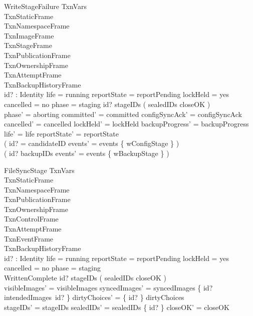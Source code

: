 \documentclass{article}
\begin{document}
\begin{schema}{WriteStageFailure}
	\Delta TxnVars \\
	TxnStaticFrame \\
	TxnNamespaceFrame \\
	TxnImageFrame \\
	TxnStageFrame \\
	TxnPublicationFrame \\
	TxnOwnershipFrame \\
	TxnAttemptFrame \\
	TxnBackupHistoryFrame \\
	id? : Identity
	\where
	life = running \land reportState = reportPending \land lockHeld = yes \land
	cancelled = no \land phase = staging \land
	id? \in stageIDs \setminus ( sealedIDs \cup closeOK ) \\
	phase' = aborting \land committed' = committed \land
	configSyncAck' = configSyncAck \land cancelled' = cancelled \land
	lockHeld' = lockHeld \land backupProgress' = backupProgress \land
	life' = life \land reportState' = reportState \\
	( id? = candidateID \implies events' = events \cup \{ wConfigStage \} ) \\
	( id? \in backupIDs \implies events' = events \cup \{ wBackupStage \} )
\end{schema}

\begin{schema}{FileSyncStage}
	\Delta TxnVars \\
	TxnStaticFrame \\
	TxnNamespaceFrame \\
	TxnPublicationFrame \\
	TxnOwnershipFrame \\
	TxnControlFrame \\
	TxnAttemptFrame \\
	TxnEventFrame \\
	TxnBackupHistoryFrame \\
	id? : Identity
	\where
	life = running \land reportState = reportPending \land lockHeld = yes \land
	cancelled = no \land phase = staging \\
	WrittenComplete \land id? \in stageIDs \setminus ( sealedIDs \cup closeOK ) \\
	visibleImages' = visibleImages \land
	syncedImages' = syncedImages \oplus \{ id? \mapsto intendedImages~id? \} \land
	dirtyChoices' = \{ id? \} \ndres dirtyChoices \\
	stageIDs' = stageIDs \land sealedIDs' = sealedIDs \cup \{ id? \} \land
	closeOK' = closeOK
\end{schema}
\end{document}
